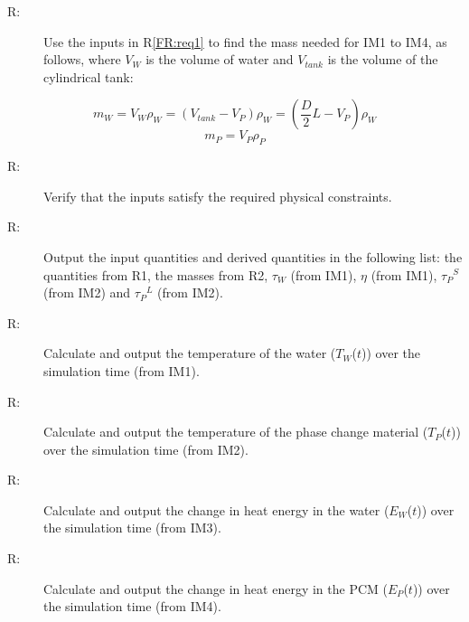 \documentclass[12pt]{article}
\newcounter{reqnum}
\newcommand{\rthereqnum}{R\thereqnum}
\begin{document}
\begin{description}
\item[\rthereqnum\label{FR:req2}:]Use the inputs in R\ref{FR:req1} to find the mass needed for IM1 to IM4, as follows, where ${V_{W}}$ is the volume of water and ${V_{tank}}$ is the volume of the cylindrical tank:
\end{description}
\begin{dmath}
{m_{W}}={V_{W}} {ρ_{W}}=\left({V_{tank}}-{V_{P}}\right) {ρ_{W}}=\left(\frac{D}{2} L-{V_{P}}\right) {ρ_{W}}
\end{dmath}
\begin{dmath}
{m_{P}}={V_{P}} {ρ_{P}}
\end{dmath}
\begin{description}
\item[\rthereqnum\label{FR:req3}:]Verify that the inputs satisfy the required physical constraints.
\end{description}
\begin{description}
\item[\rthereqnum\label{FR:req4}:]Output the input quantities and derived quantities in the following list: the quantities from R1, the masses from R2, ${τ_{W}}$ (from IM1), $η$ (from IM1), ${{τ_{P}}^{S}}$ (from IM2) and ${{τ_{P}}^{L}}$ (from IM2).
\end{description}
\begin{description}
\item[\rthereqnum\label{FR:req5}:]Calculate and output the temperature of the water (${T_{W}}$($t$)) over the simulation time (from IM1).
\end{description}
\begin{description}
\item[\rthereqnum\label{FR:req6}:]Calculate and output the temperature of the phase change material (${T_{P}}$($t$)) over the simulation time (from IM2).
\end{description}
\begin{description}
\item[\rthereqnum\label{FR:req7}:]Calculate and output the change in heat energy in the water (${E_{W}}$($t$)) over the simulation time (from IM3).
\end{description}
\begin{description}
\item[\rthereqnum\label{FR:req8}:]Calculate and output the change in heat energy in the PCM (${E_{P}}$($t$)) over the simulation time (from IM4).
\end{description}
\end{document}
